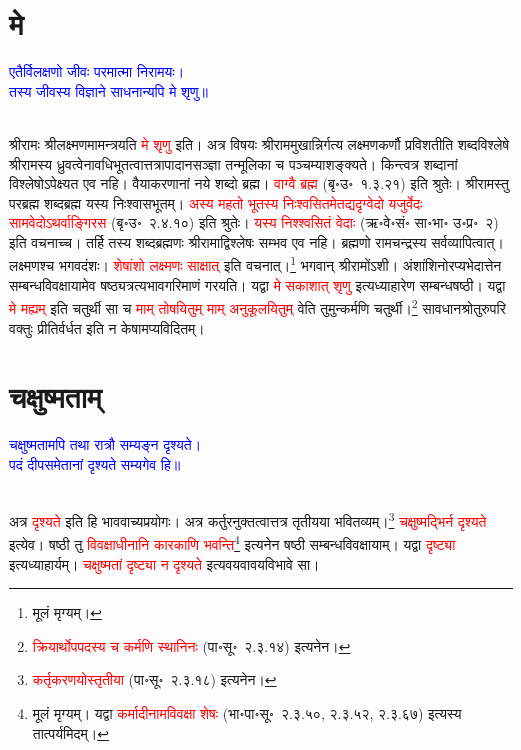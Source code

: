 \section[मे]{मे}
\centering\textcolor{blue}{एतैर्विलक्षणो जीवः परमात्मा निरामयः।\nopagebreak\\
तस्य जीवस्य विज्ञाने साधनान्यपि मे शृणु॥}\nopagebreak\\
\\
\begin{sloppypar}\justifying\noindent\hspace{10mm} श्रीरामः श्रीलक्ष्मणमामन्त्रयति \textcolor{red}{मे शृणु} इति। अत्र विषयः श्रीराम\-मुखान्निर्गत्य लक्ष्मण\-कर्णौ प्रविशतीति शब्द\-विश्लेषे श्रीरामस्य ध्रुवत्वेनावधि\-भूतत्वात्तत्रापादान\-सञ्ज्ञा तन्मूलिका च पञ्चम्याशङ्क्यते। किन्त्वत्र शब्दानां विश्लेषोऽपेक्ष्यत एव नहि। वैयाकरणानां नये शब्दो ब्रह्म। \textcolor{red}{वाग्वै ब्रह्म} (बृ॰उ॰~१.३.२१) इति श्रुतेः। श्रीरामस्तु पर\-ब्रह्म शब्द\-ब्रह्म यस्य निःश्वास\-भूतम्। \textcolor{red}{अस्य महतो भूतस्य निःश्वसितमेतद्यदृग्वेदो यजुर्वेदः सामवेदोऽथर्वाङ्गिरस} (बृ॰उ॰~२.४.१०) इति श्रुतेः। \textcolor{red}{यस्य निश्श्वसितं वेदाः} (ऋ॰वे॰सं॰ सा॰भा॰ उ॰प्र॰~२) इति वचनाच्च। तर्हि तस्य शब्द\-ब्रह्मणः श्रीरामाद्विश्लेषः सम्भव एव नहि। ब्रह्मणो रामचन्द्रस्य सर्व\-व्यापित्वात्। लक्ष्मणश्च भगवदंशः। \textcolor{red}{शेषांशो लक्ष्मणः साक्षात्‌} इति वचनात्।\footnote{मूलं मृग्यम्।} भगवान् श्रीरामोंऽशी। अंशांशिनोरप्यभेदात्तेन सम्बन्ध\-विवक्षायामेव षष्ठ्यत्रत्य\-भाव\-गरिमाणं गरयति। यद्वा \textcolor{red}{मे सकाशात् शृणु} इत्यध्याहारेण सम्बन्ध\-षष्ठी। यद्वा \textcolor{red}{मे मह्यम्‌} इति चतुर्थी सा च \textcolor{red}{माम् तोषयितुम् माम् अनुकूलयितुम्‌} वेति तुमुन्कर्मणि चतुर्थी।\footnote{\textcolor{red}{क्रियार्थोपपदस्य च कर्मणि स्थानिनः} (पा॰सू॰~२.३.१४) इत्यनेन।} सावधान\-श्रोतुरुपरि वक्तुः प्रीतिर्वर्धत इति न केषामप्यविदितम्।\end{sloppypar}
\section[चक्षुष्मताम्]{चक्षुष्मताम्‌}
\centering\textcolor{blue}{चक्षुष्मतामपि तथा रात्रौ सम्यङ्न दृश्यते।\nopagebreak\\
पदं दीपसमेतानां दृश्यते सम्यगेव हि॥}\nopagebreak\\
\\
\begin{sloppypar}\justifying\noindent\hspace{10mm} अत्र \textcolor{red}{दृश्यते} इति हि भाव\-वाच्य\-प्रयोगः। अत्र कर्तुरनुक्तत्वात्तत्र तृतीयया भवितव्यम्।\footnote{\textcolor{red}{कर्तृ\-करणयोस्तृतीया} (पा॰सू॰~२.३.१८) इत्यनेन।} \textcolor{red}{चक्षुष्मद्भिर्न दृश्यते} इत्येव। षष्ठी तु \textcolor{red}{विवक्षाधीनानि कारकाणि भवन्ति}\footnote{मूलं मृग्यम्। यद्वा \textcolor{red}{कर्मादीनामविवक्षा शेषः} (भा॰पा॰सू॰~२.३.५०, २.३.५२, २.३.६७) इत्यस्य तात्पर्यमिदम्।} इत्यनेन षष्ठी सम्बन्ध\-विवक्षायाम्। यद्वा \textcolor{red}{दृष्ट्या} इत्यध्याहार्यम्। \textcolor{red}{चक्षुष्मतां दृष्ट्या न दृश्यते} इत्यवयवावयवि\-भावे सा।\end{sloppypar}
